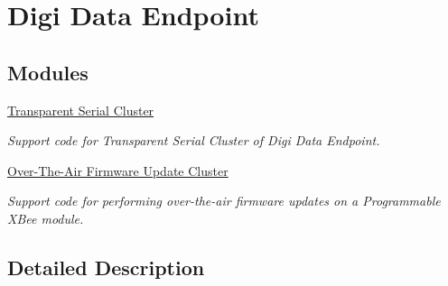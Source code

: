 \hypertarget{group__xbee__digi__data}{\section{Digi Data Endpoint}
\label{group__xbee__digi__data}
}
\subsection*{Modules}
\begin{DoxyCompactItemize}
\item 
\hyperlink{group__xbee__transparent}{Transparent Serial Cluster}
\begin{DoxyCompactList}\small\item\em Support code for Transparent Serial Cluster of Digi Data Endpoint. \end{DoxyCompactList}\item 
\hyperlink{group__xbee__ota}{Over-\/\-The-\/\-Air Firmware Update Cluster}
\begin{DoxyCompactList}\small\item\em Support code for performing over-\/the-\/air firmware updates on a Programmable X\-Bee module. \end{DoxyCompactList}\end{DoxyCompactItemize}


\subsection{Detailed Description}
